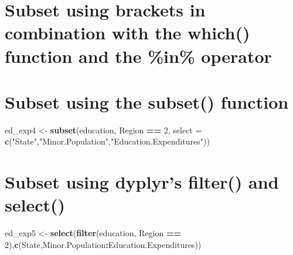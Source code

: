 \documentclass[]{book}
\newenvironment{Shaded}{\begin{snugshade}}{\end{snugshade}}
\newcommand{\DataTypeTok}[1]{\textcolor[rgb]{0.13,0.29,0.53}{#1}}
\newcommand{\DecValTok}[1]{\textcolor[rgb]{0.00,0.00,0.81}{#1}}
\newcommand{\KeywordTok}[1]{\textcolor[rgb]{0.13,0.29,0.53}{\textbf{#1}}}
\newcommand{\NormalTok}[1]{#1}
\newcommand{\OperatorTok}[1]{\textcolor[rgb]{0.81,0.36,0.00}{\textbf{#1}}}
\newcommand{\StringTok}[1]{\textcolor[rgb]{0.31,0.60,0.02}{#1}}
\begin{document}
\hypertarget{subset-using-brackets-in-combination-with-the-which-function-and-the-in-operator}{%
\section{Subset using brackets in combination with the which() function and the \%in\% operator}\label{subset-using-brackets-in-combination-with-the-which-function-and-the-in-operator}}

\begin{Shaded}
\end{Shaded}

\hypertarget{subset-using-the-subset-function}{%
\section{Subset using the subset() function}\label{subset-using-the-subset-function}}

\begin{Shaded}
\begin{Highlighting}[]
\NormalTok{ed_exp4 <-}\StringTok{ }\KeywordTok{subset}\NormalTok{(education, Region }\OperatorTok{==}\StringTok{ }\DecValTok{2}\NormalTok{, }\DataTypeTok{select =} \KeywordTok{c}\NormalTok{(}\StringTok{"State"}\NormalTok{,}\StringTok{"Minor.Population"}\NormalTok{,}\StringTok{"Education.Expenditures"}\NormalTok{))}
\end{Highlighting}
\end{Shaded}

\hypertarget{subset-using-dyplyrs-filter-and-select}{%
\section{Subset using dyplyr's filter() and select()}\label{subset-using-dyplyrs-filter-and-select}}

\begin{Shaded}
\begin{Highlighting}[]
\NormalTok{ed_exp5 <-}\StringTok{ }\KeywordTok{select}\NormalTok{(}\KeywordTok{filter}\NormalTok{(education, Region }\OperatorTok{==}\StringTok{ }\DecValTok{2}\NormalTok{),}\KeywordTok{c}\NormalTok{(State,Minor.Population}\OperatorTok{:}\NormalTok{Education.Expenditures))}
\end{Highlighting}
\end{Shaded}


\end{document}
